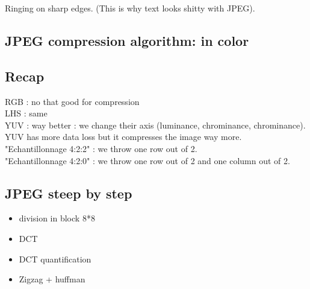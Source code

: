 \documentclass[a4paper,11pt]{article}
\begin{document}
Ringing on sharp edges. (This is why text looks shitty with JPEG).

\subsection{JPEG compression algorithm: in color}

\subsection{Recap}
RGB : no that good for compression\\
LHS : same\\
YUV : way better : we change their axis (luminance, chrominance, chrominance).
YUV has more data loss but it compresses the image way more.\\
"Echantillonnage 4:2:2" : we throw one row out of 2.\\
"Echantillonnage 4:2:0" : we throw one row out of 2 and one column out of 2.\\


\subsection{JPEG steep by step}
\begin{itemize}
  \item division in block 8*8
  \item DCT
  \item DCT quantification
  \item Zigzag + huffman
\end{itemize}
\end{document}
